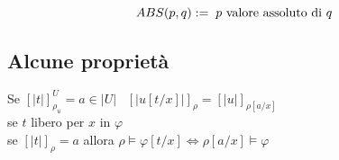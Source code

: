 \documentclass{article}
\theoremstyle{break}
\theoremstyle{break}
\theoremstyle{break}
\theoremstyle{break}
\begin{document}
\begin{figure}[H]
  \begin{exercise}[A casa]
    \[
    ABS(p,q) := \; \text{\( p \) valore assoluto di \( q \)}
    \] 
  \end{exercise}
\end{figure}

\subsection{Alcune proprietà}
Se \( [|t|]_{\rho_u}^U = a \in |U| \;\;\; [|u[t/x]|]_{\rho} = [|u|]_{\rho[a/x]} \) \\
se \( t \) libero per \( x \) in \( \varphi  \)\\
se \( [|t|]_{\rho } = a \) allora \( \rho \models \varphi[t/x] \Leftrightarrow \rho[a/x] \models \varphi  \) 
\end{document}
